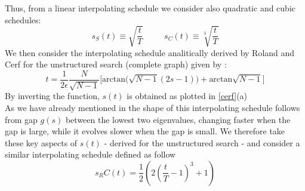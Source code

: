         Thus, from a linear interpolating schedule we consider also quadratic and cubic schedules:
        \begin{equation}
          s_S(t) \equiv \sqrt{\frac{t}{T}} \hspace{30pt} s_C(t) \equiv \sqrt[3]{\frac{t}{T}}
        \end{equation}
        We then consider the interpolating schedule analitically derived by Roland and Cerf for the unstructured search (complete graph) given by :
        \begin{equation}
            t = \frac{1}{2\epsilon}\frac{N}{\sqrt{N-1}}\Big[\mbox{arctan}\big(\sqrt{N-1}(2s-1)\big) + \mbox{arctan}\sqrt{N-1}\Big]
        \end{equation}
        By inverting the function, $s(t)$ is obtained as plotted in \cref{cerf}(a) \\
        As we have already mentioned in  the shape of this interpolating schedule follows from gap $g(s)$ between the lowest two eigenvalues, changing faster when the gap is large, while it evolves slower when the gap is small. We therefore take these key aspects of $s(t)$ - derived for the unstructured search - and consider a similar interpolating schedule defined as follow
        \begin{equation}
            s_RC(t) = \frac{1}{2}(2(\frac{t}{T}-1)^{3}+1)
        \end{equation}

